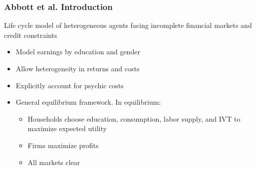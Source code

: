 \documentclass{beamer}
\begin{document}


\begin{frame}
\frametitle{Abbott et al. Introduction}
Life cycle model of heterogeneous agents facing incomplete financial markets and credit constraints
\begin{itemize}
\item Model earnings by education and gender
\item Allow heterogeneity in returns and costs
\item Explicitly account for psychic costs
\item General equilibrium framework. In equilibrium:
\begin{itemize}
\item Households choose education, consumption, labor supply, and IVT to maximize expected utility
\item Firms maximize profits
\item All markets clear 
\end{itemize}
\end{itemize}
\end{frame}
\end{document}
